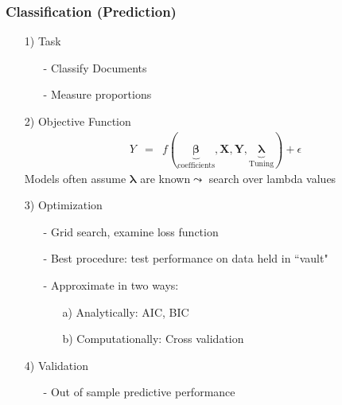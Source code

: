 \documentclass{beamer}
\begin{document}
\begin{frame}
\frametitle{Classification (Prediction)}
\begin{itemize}
\item[1)] Task
\begin{itemize}
\item[-] Classify Documents
\item[-] Measure proportions
\end{itemize}
\item[2)] Objective Function
\begin{eqnarray}
Y & = & f(\underbrace{\boldsymbol{\beta}}_{\text{coefficients}}, \boldsymbol{X}, \boldsymbol{Y}, \underbrace{\boldsymbol{\lambda}}_{\text{Tuning}}) + \epsilon \nonumber 
\end{eqnarray}
Models often assume $\boldsymbol{\lambda}$ are known$\leadsto$ search over lambda values
\item[3)] Optimization
\begin{itemize}
\item[-] Grid search, examine \alert{loss} function
\item[-] Best procedure: test performance on data held in ``vault"
\item[-] Approximate in two ways:
\begin{itemize}
\item[a)] Analytically: AIC, BIC
\item[b)] Computationally: \alert{Cross validation}
\end{itemize}
\end{itemize}
\item[4)] Validation
\begin{itemize}
\item[-] Out of sample predictive performance
\end{itemize}
\end{itemize}

\end{frame}
\end{document}
